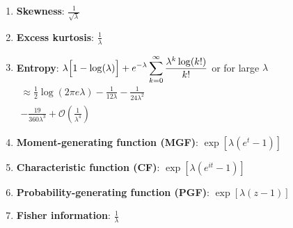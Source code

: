 \begin{enumerate}

    \item \textbf{Skewness}:
    $
         {\displaystyle {\frac {1}{\sqrt {\lambda }}}}
    $
    \hfill \cite{wiki/Poisson_distribution}

    \item \textbf{Excess kurtosis}: 
    $
         {\displaystyle {\frac {1}{\lambda }}}
    $
    \hfill \cite{wiki/Poisson_distribution}

    \item \textbf{Entropy}: 
    ${\displaystyle \lambda {\Bigl [}1-\log(\lambda ){\Bigr ]}+e^{-\lambda }\sum _{k=0}^{\infty }{\frac {\lambda ^{k}\log(k!)}{k!}}}$ 
    or for large ${\displaystyle \lambda }$
    ${\displaystyle {\begin{aligned}\approx {\frac {1}{2}}\log \left(2\pi e\lambda \right)-{\frac {1}{12\lambda }}-{\frac {1}{24\lambda ^{2}}}\\-{\frac {19}{360\lambda ^{3}}}+{\mathcal {O}}\left({\frac {1}{\lambda ^{4}}}\right)\end{aligned}}}$
    \hfill \cite{wiki/Poisson_distribution}

    \item \textbf{Moment-generating function (MGF)}: 
    $
         {\displaystyle \exp \left[\lambda \left(e^{t}-1\right)\right]}
    $
    \hfill \cite{wiki/Poisson_distribution}
    
    \item \textbf{Characteristic function (CF)}:
    $   
         {\displaystyle \exp \left[\lambda \left(e^{it}-1\right)\right]}
    $
    \hfill \cite{wiki/Poisson_distribution}

    \item \textbf{Probability-generating function (PGF)}:
    $
         {\displaystyle \exp \left[\lambda \left(z-1\right)\right]}
    $
    \hfill \cite{wiki/Poisson_distribution}

    \item \textbf{Fisher information}:
    $
         {\displaystyle {\frac {1}{\lambda }}}
    $
    \hfill \cite{wiki/Poisson_distribution}
\end{enumerate}

















